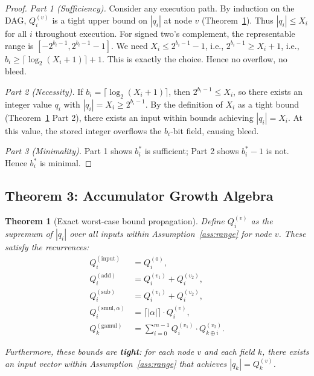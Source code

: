 \documentclass[11pt,a4paper]{article}
\theoremstyle{definition}
\theoremstyle{plain}
\newtheorem{theorem}{Theorem}[section]
\theoremstyle{remark}
\begin{document}
\begin{proof}
\textit{Part 1 (Sufficiency).}  Consider any execution path.  By induction on the DAG, $Q_i^{(v)}$ is a tight upper bound on $|q_i|$ at node $v$ (Theorem~\ref{thm:growth}).  Thus $|q_i| \le X_i$ for all $i$ throughout execution.  For signed two's complement, the representable range is $[-2^{b_i-1}, 2^{b_i-1}-1]$.  We need $X_i \le 2^{b_i-1}-1$, i.e., $2^{b_i-1} \ge X_i+1$, i.e., $b_i \ge \lceil \log_2(X_i+1)\rceil + 1$.  This is exactly the choice.  Hence no overflow, no bleed.

\textit{Part 2 (Necessity).}  If $b_i = \lceil\log_2(X_i+1)\rceil$, then $2^{b_i-1} \le X_i$, so there exists an integer value $q_i$ with $|q_i| = X_i \ge 2^{b_i-1}$.  By the definition of $X_i$ as a tight bound (Theorem~\ref{thm:growth} Part 2), there exists an input within bounds achieving $|q_i| = X_i$.  At this value, the stored integer overflows the $b_i$-bit field, causing bleed.

\textit{Part 3 (Minimality).}  Part 1 shows $b_i^*$ is sufficient; Part 2 shows $b_i^*-1$ is not.  Hence $b_i^*$ is minimal.
\end{proof}

\subsection{Theorem 3: Accumulator Growth Algebra}
\label{sec:growth}

\begin{theorem}[Exact worst-case bound propagation]
\label{thm:growth}
Define $Q_i^{(v)}$ as the supremum of $|q_i|$ over all inputs within Assumption~\ref{ass:range} for node $v$.  These satisfy the recurrences:
\begin{align}
  Q_i^{(\mathrm{input})} &= Q_i^{(0)}, \label{eq:rec-input}\\
  Q_i^{(\mathrm{add})} &= Q_i^{(v_1)} + Q_i^{(v_2)}, \label{eq:rec-add}\\
  Q_i^{(\mathrm{sub})} &= Q_i^{(v_1)} + Q_i^{(v_2)}, \label{eq:rec-sub}\\
  Q_i^{(\mathrm{smul},\alpha)} &= \lceil|\alpha|\rceil \cdot Q_i^{(v)}, \label{eq:rec-smul}\\
  Q_k^{(\mathrm{gamul})} &= \sum_{i=0}^{m-1} Q_i^{(v_1)} \cdot Q_{k\oplus i}^{(v_2)}. \label{eq:rec-gamul}
\end{align}

Furthermore, these bounds are \textbf{tight}: for each node $v$ and each field $k$, there exists an input vector within Assumption~\ref{ass:range} that achieves $|q_k| = Q_k^{(v)}$.
\end{theorem}
\end{document}
